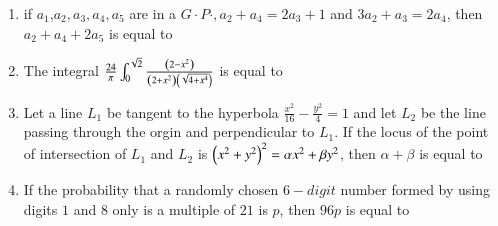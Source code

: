 \documentclass[journal,12pt,onecolumn]{IEEEtran}
\theoremstyle{remark}
\begin{document}
\begin{enumerate}
\item if $a_1$,$a_2,a_3,a_4,a_5$ are in a $G\cdot P\cdot ,a_2+a_4=2a_3+1$ and $3a_2+a_3=2a_4$, then $a_2+a_4+2a_5$ is equal to 
\item The integral $\frac{24}{\pi}\int_{0}^{\sqrt{2}}\frac{\left(2-x^2\right)}{\left(2+x^2\right)\left(\sqrt{4+x^4}\right)}$ is equal to 
\item Let a line $L_1$ be tangent to the hyperbola $\frac{x^2}{16}-\frac{y^2}{4}=1$ and let $L_2$ be the line passing through the orgin and perpendicular to $L_1$. If the locus of the point of intersection of $L_1$ and $L_2$ is $\left(x^2+y^2\right)^2=\alpha x^2+\beta y^2$, then $\alpha + \beta $ is equal to 
\item If the probability that a randomly chosen $6-digit$ number formed by using digits $1$ and $8$ only is a multiple of $21$ is $p$, then $96 p$ is equal to 
\end{enumerate}
\end{document}
